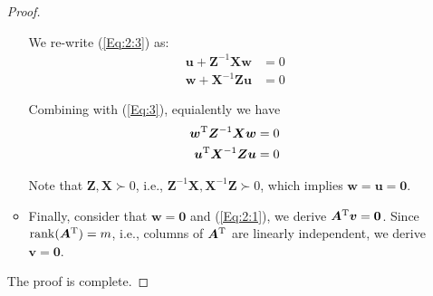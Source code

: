 \begin{enumerate}
\begin{proof}
\begin{itemize}
We re-write (\ref{Eq:2:3}) as:
\begin{subequations}
\begin{align}
\bm u+\bm Z^{-1}\bm X\bm w&=0\\
\bm w+\bm X^{-1}\bm Z\bm u&=0
\end{align}
\end{subequations}

Combining with (\ref{Eq:3}), equialently we have
\begin{subequations}
\begin{align}
\bm w^{\mathrm T}\bm Z^{-1}\bm X\bm w&=0\\
\bm u^{\mathrm T}\bm X^{-1}\bm Z\bm u&=0
\end{align}
\end{subequations}

Note that $\bm Z,\bm X\succ0$, i.e., $\bm Z^{-1}\bm X,\bm X^{-1}\bm Z\succ0$, which implies $\bm w=\bm u=\bm0$.
\item
Finally, consider that $\bm w=\bm0$ and (\ref{Eq:2:1}), we derive $\bm A^{\mathrm T}\bm v=\bm0$. Since $\operatorname{rank}(\bm A^{\mathrm T})=m$, i.e., columns of $\bm A^{\mathrm T}$ are linearly independent, we derive $\bm v=\bm0$.
\end{itemize}
The proof is complete. 
\end{proof}


\end{enumerate}
